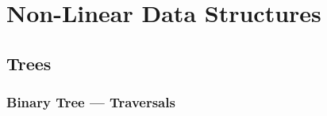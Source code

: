 \documentclass[11pt,a4paper]{report}
\begin{document}
\part{Non-Linear Data Structures}

\chapter{Trees}

\section{Binary Tree --- Traversals}
\end{document}
